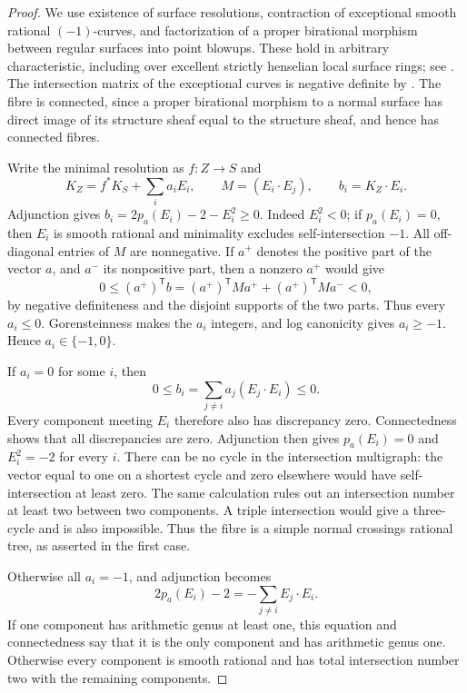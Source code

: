\begin{proof}
We use existence of surface resolutions, contraction of exceptional
smooth rational $(-1)$-curves, and factorization of a proper
birational morphism between regular surfaces into point blowups.
These hold in arbitrary characteristic, including over excellent
strictly henselian local surface rings; see
\cite[Theorem 54.14.5, Lemmas 54.16.8 and 54.17.1;
tags 0BGP, 0C2M and 0C5R]{StacksDSurfaceResolution}.
The intersection matrix of the exceptional curves is negative
definite by \cite[section 10.1, Theorem 10.1]{Kollar2013D}.
The fibre is connected, since a proper birational morphism to a
normal surface has direct image of its structure sheaf equal to
the structure sheaf, and hence has connected fibres.

Write the minimal resolution as $f:Z\to S$ and
\[
 K_Z=f^*K_S+\sum_i a_i E_i,\qquad
 M=(E_i\cdot E_j),\qquad b_i=K_Z\cdot E_i.
\]
Adjunction gives
$b_i=2p_a(E_i)-2-E_i^2\geq0$.
Indeed $E_i^2<0$; if $p_a(E_i)=0$, then $E_i$ is smooth rational
and minimality excludes self-intersection $-1$.
All off-diagonal entries of $M$ are nonnegative.
If $a^+$ denotes the positive part of the vector $a$, and $a^-$
its nonpositive part, then a nonzero $a^+$ would give
\[
 0\leq (a^+)^{\mathsf T}b
 =(a^+)^{\mathsf T}Ma^++(a^+)^{\mathsf T}Ma^-<0,
\]
by negative definiteness and the disjoint supports of the two parts.
Thus every $a_i\leq0$.  Gorensteinness makes the $a_i$ integers,
and log canonicity gives $a_i\geq-1$.  Hence
$a_i\in\{-1,0\}$.

If $a_i=0$ for some $i$, then
\[
 0\leq b_i=\sum_{j\ne i}a_j(E_j\cdot E_i)\leq0.
\]
Every component meeting $E_i$ therefore also has discrepancy zero.
Connectedness shows that all discrepancies are zero.  Adjunction
then gives $p_a(E_i)=0$ and $E_i^2=-2$ for every $i$.
There can be no cycle in the intersection multigraph: the vector
equal to one on a shortest cycle and zero elsewhere would have
self-intersection at least zero.  The same calculation rules out
an intersection number at least two between two components.
A triple intersection would give a three-cycle and is also
impossible.  Thus the fibre is a simple normal crossings rational
tree, as asserted in the first case.

Otherwise all $a_i=-1$, and adjunction becomes
\begin{equation}\label{D:eq-Gorenstein-lc-adjunction}
 2p_a(E_i)-2=-\sum_{j\ne i}E_j\cdot E_i.
\end{equation}
If one component has arithmetic genus at least one, this equation
and connectedness say that it is the only component and has
arithmetic genus one.  Otherwise every component is smooth
rational and has total intersection number two with the remaining
components.


\end{proof}
